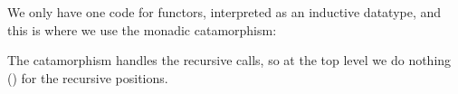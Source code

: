 \documentclass[fleqn,runningheads]{llncs}
\begin{document}
\begin{AgdaAlign}
\begin{code}
\<%
\end{code}
We only have one code for functors, interpreted as an inductive datatype, and this is where we use the monadic catamorphism:
\begin{code}%
%
\>[2]\AgdaSpace{}%
\AgdaSymbol{(}\AgdaSpace{}%
\AgdaSymbol{)}\AgdaSpace{}%
\AgdaSpace{}%
\AgdaSymbol{=}\AgdaSpace{}%
\AgdaSpace{}%
\AgdaSpace{}%
\AgdaSymbol{(}\AgdaSpace{}%
\AgdaSpace{}%
\AgdaSpace{}%
\AgdaSymbol{)}\<%
\end{code}
The catamorphism handles the recursive calls, so at the top level we do nothing () for the recursive positions.


\end{AgdaAlign}
\end{document}
